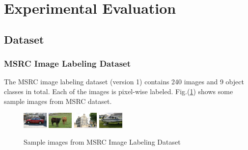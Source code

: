 \documentclass{sig-alternate}
\begin{document}
\section{Experimental Evaluation}\label{sec:exp}
\subsection{Dataset}
\subsubsection{MSRC Image Labeling Dataset}
The MSRC image labeling dataset (version 1) \cite{msrc} contains 240 images and 9 object classes in total. 
Each of the images is pixel-wise labeled. Fig.(\ref{fig:msrc}) shows some sample images from MSRC dataset.
\begin{figure}[!htb]
\centering
\includegraphics[width=0.11\textwidth]{fig/sample-msrc1}
\includegraphics[width=0.11\textwidth]{fig/sample-msrc2}
\includegraphics[width=0.11\textwidth]{fig/sample-msrc3}
\includegraphics[width=0.11\textwidth]{fig/sample-msrc4}
\caption{Sample images from MSRC Image Labeling Dataset}\label{fig:msrc}
\end{figure}
\end{document}
